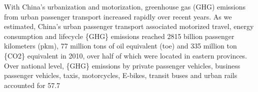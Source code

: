 With China’s urbanization and motorization, greenhouse gas (GHG) emissions from urban passenger transport increased rapidly over recent years. As we estimated, China’s urban passenger transport associated motorized travel, energy consumption and lifecycle \{GHG\} emissions reached 2815 billion passenger kilometers (pkm), 77 million tons of oil equivalent (toe) and 335 million ton \{CO2\} equivalent in 2010, over half of which were located in eastern provinces. Over national level, \{GHG\} emissions by private passenger vehicles, business passenger vehicles, taxis, motorcycles, E-bikes, transit buses and urban rails accounted for 57.7%